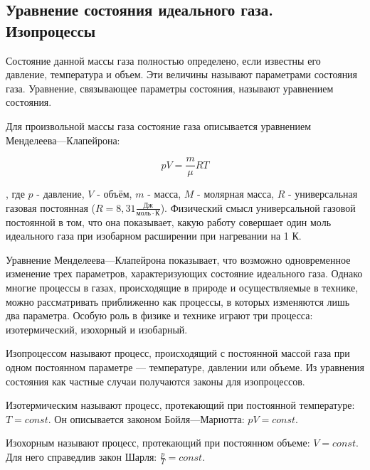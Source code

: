 \subsection{Уравнение состояния идеального газа. Изопроцессы}

Состояние данной массы газа полностью определено, если известны его давление, температура и объем. 
Эти величины называют параметрами состояния газа. Уравнение, связывающее параметры состояния, 
называют уравнением состояния.

\begin{definition}
    Для произвольной массы газа состояние газа описывается уравнением Менделеева—Клапейрона:
\end{definition}

$$pV = \frac{m}{\mu}RT$$

, где $p$ - давление, $V$ - объём, $m$ - масса, $M$ - молярная масса, $R$ - универсальная 
газовая постоянная ($R = 8,31 \frac{Дж}{моль \cdot К}$). Физический смысл универсальной газовой постоянной 
в том, что она показывает, какую работу совершает один моль идеального газа при изобарном расширении 
при нагревании на 1 К.

Уравнение Менделеева—Клапейрона показывает, что возможно одновременное изменение трех параметров, 
характеризующих состояние идеального газа. Однако многие процессы в газах, происходящие в природе и 
осуществляемые в технике, можно рассматривать приближенно как процессы, в которых изменяются лишь два 
параметра. Особую роль в физике и технике играют три процесса: изотермический, изохорный и изобарный.

\begin{definition}
    Изопроцессом называют процесс, происходящий с постоянной массой газа при одном постоянном параметре — температуре, давлении или объеме.
    Из уравнения состояния как частные случаи получаются законы для изопроцессов.
\end{definition}


\begin{definition}
    Изотермическим называют процесс, протекающий при постоянной температуре: $T = const$.
    Он описывается законом Бойля—Мариотта: $pV = const$.
\end{definition}

\begin{definition}
    Изохорным называют процесс, протекающий при постоянном объеме: $V = const$. 
    Для него справедлив закон Шарля: $\frac{p}{T} = const$.
\end{definition}


